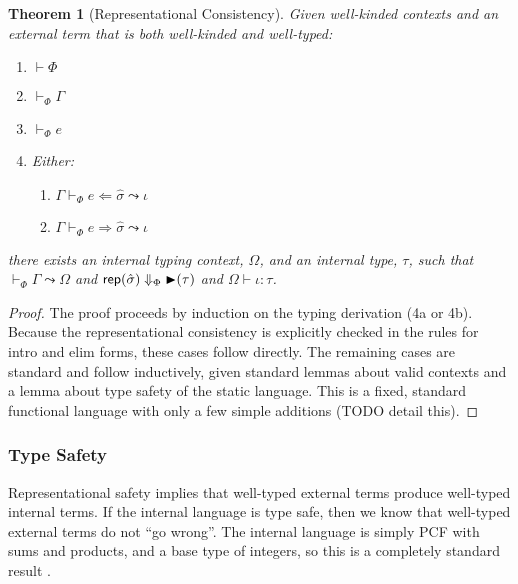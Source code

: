 \documentclass[10pt,preprint]{sigplanconf}
\newtheorem{theorem}{Theorem}
\begin{document}
{\begin{theorem}[Representational Consistency]
Given well-kinded contexts and an external term that is both well-kinded and well-typed:
\begin{enumerate}
\item $\vdash \Phi$ 
\item $\vdash_\Phi \Gamma$
\item $\vdash_\Phi e$
\item Either:
\begin{enumerate}
\item[a.] $\Gamma \vdash_\Phi e \Leftarrow \hat{\sigma} \leadsto \iota$
\item[b.] $\Gamma \vdash_\Phi e \Rightarrow \hat{\sigma} \leadsto \iota$
\end{enumerate}
\end{enumerate}
there exists an internal typing context, $\Omega$, and an internal type, $\tau$, such that  $\vdash_\Phi \Gamma \leadsto \Omega$ and ${\sf rep}(\hat\sigma) \Downarrow_\Phi {\blacktriangleright}(\tau)$ and $\Omega \vdash \iota : \tau$.
\end{theorem}
\begin{proof}
The proof proceeds by induction on the typing derivation (4a or 4b). Because the representational consistency is explicitly checked in the rules for intro and elim forms, these cases follow directly. The remaining cases are standard and follow inductively, given standard lemmas about valid contexts and a lemma about type safety of the static language. This is a fixed, standard functional language with only a few simple additions (TODO detail this).
\end{proof}

\subsubsection{Type Safety}
Representational safety implies that well-typed external terms produce well-typed internal terms. If the internal language is type safe, then we know that well-typed external terms do not ``go wrong''. The internal language is simply PCF with sums and products, and a base type of integers, so this is a completely standard result \cite{pfpl}.

}
\end{document}
